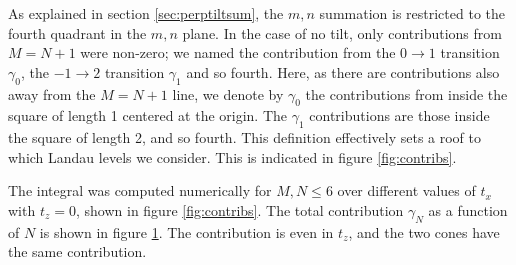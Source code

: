 As explained in section \ref{sec:perptiltsum}, the \( m,n \) summation is restricted to the fourth quadrant in the \( m,n \) plane.
In the case of no tilt, only contributions from \( M = N + 1 \) were non-zero;
we named the contribution from the \( 0\to 1 \) transition \( \gamma_0 \), the \( -1\to 2 \) transition \( \gamma_1 \) and so fourth.
Here, as there are contributions also away from the \( M=N + 1 \) line, we denote by \( \gamma_0 \) the contributions from inside the square of length 1 centered at the origin.
The \( \gamma_1 \) contributions are those inside the square of length 2, and so fourth.
This definition effectively sets a roof to which Landau levels we consider.
This is indicated in figure \ref{fig:contribs}.

The integral was computed numerically for \( M,N \leq 6 \) over different values of \( t_x \) with \( t_z = 0 \), shown in figure \ref{fig:contribs}.
The total contribution \( \gamma_N \) as a function of \( N \) is shown in figure \ref{fig:total_contribs}.
The contribution is even in \( t_z \), and the two cones have the same contribution.

\begin{figure}[ht]
  \centering
  \caption{\label{fig:total_contribs} }
\end{figure}


